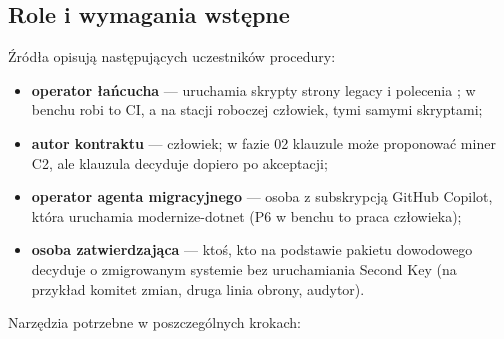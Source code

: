 \subsection{Role i wymagania wstępne}\label{sec:procedura-wymagania}

Źródła opisują następujących uczestników procedury:

\begin{itemize}
  \item \textbf{operator łańcucha} --- uruchamia skrypty strony legacy i polecenia
        ; w benchu robi to CI, a na stacji roboczej człowiek, tymi samymi
        skryptami;
  \item \textbf{autor kontraktu} --- człowiek; w fazie 02 klauzule może proponować miner
        C2, ale klauzula decyduje dopiero po akceptacji;
  \item \textbf{operator agenta migracyjnego} --- osoba z subskrypcją GitHub Copilot,
        która uruchamia modernize-dotnet (P6 w benchu to praca człowieka);
  \item \textbf{osoba zatwierdzająca} --- ktoś, kto na podstawie pakietu dowodowego
        decyduje o zmigrowanym systemie bez uruchamiania Second Key (na przykład komitet
        zmian, druga linia obrony, audytor).
\end{itemize}

Narzędzia potrzebne w poszczególnych krokach:

